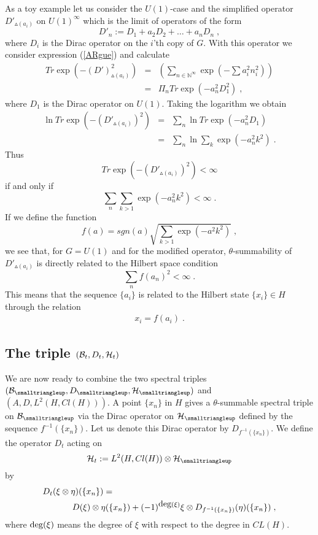 \documentclass[12pt]{article}
\newcommand{\ba}{\begin{eqnarray}}
\newcommand{\ea}{\end{eqnarray}}
\newcommand{\nn}{\nonumber}
\def\P{\Pi}
\def\cb{{\cal B}}
\def\ch{{\cal H}}
\begin{document}
As a toy example let us consider the $U(1)$-case and the simplified operator $D'_{\smalltriangleup(a_i)}$ on $U(1)^\infty$ which is the limit of operators of the form 
$$
D'_n := D_1 + a_2 D_2 + \ldots + a_n D_n\;,
$$ 
where $D_i$ is the Dirac operator on the $i$'th copy of $G$.
With this operator we consider expression (\ref{ARgue}) and calculate
\ba 
Tr\exp\left( -(D')_{\smalltriangleup(a_i)}^2 \right) 
&=& 
\left(\sum_{n\in\mathbb{N}^\infty}\exp\left( -\sum a_i^2 n_i^2 \right)\right)  
\nn\\
&=& 
\P_{n} Tr \exp\left( -a_n^2 D_1^2 \right)\;,
\nn 
\ea
where $D_1$ is the Dirac operator on $U(1)$. Taking the logarithm we obtain
\ba 
\ln Tr\exp\left( -(D'_{\smalltriangleup(a_i)})^2 \right) 
&=& 
\sum_n \ln Tr \exp\left( - a_n^2 D_1  \right)
\nn\\
&=& 
\sum_n \ln \sum_k\exp\left( -a_n^2 k^2 \right)\;.
\ea
Thus $$Tr\exp\left( -(D'_{\smalltriangleup(a_i)})^2 \right)<\infty $$ if and only if
\[
\sum_n\sum_{k>1} \exp\left( - a_n^2 k^2 \right) <\infty\;.
\]
If we define the function
\[
f(a)= sgn(a)\sqrt{\sum_{k>1}\exp(-a^2 k^2)  }\;,
\]
we see that, for $G=U(1)$ and for the modified operator, $\theta$-summability of $D'_{\smalltriangleup(a_i)}$ is directly related to the Hilbert space condition
\[
\sum_n f(a_n)^2 <\infty\;.
\]
This means that the sequence $\{a_i\}$ is related to the Hilbert state $\{x_i\}\in H$ through the relation
\ba 
x_i = f(a_i)\;.
\label{RELa}
\ea





















\subsection{The triple $(\cb_t,D_t,\ch_t)$}
\label{tHE}

We are now ready to combine the two spectral triples $(\cb_{\smalltriangleup},D_{\smalltriangleup},\ch_\smalltriangleup)$ and 
$(A,D,L^2(H,Cl(H)))$. A point $\{ x_n \}$ in $H$ gives a $\theta$-summable spectral triple on $\cb_{\smalltriangleup}$ via the Dirac operator on $\ch_\smalltriangleup$ defined by the sequence $f^{-1}(\{x_n\})$. Let us denote this Dirac operator by $D_{f^{-1}(\{x_n\})}$. We define the operator $D_t$ acting on 
$$ \ch_t:=  L^2(H,Cl(H)) \otimes  \ch_\smalltriangleup $$ 
by
\ba
D_t(\xi \otimes \eta )(\{x_n\})&=& \nn\\
&&\hspace{-2cm} D (\xi)\otimes \eta (\{x_n\})+(-1)^{\hbox{deg}(\xi)}\xi \otimes D_{f^{-1}(\{x_n\})} (\eta)(\{ x_n\})\;,
\label{DT}
\ea 
where $\hbox{deg}(\xi)$ means the degree of $\xi$ with respect to the degree in $CL(H)$. 
 
\end{document}
